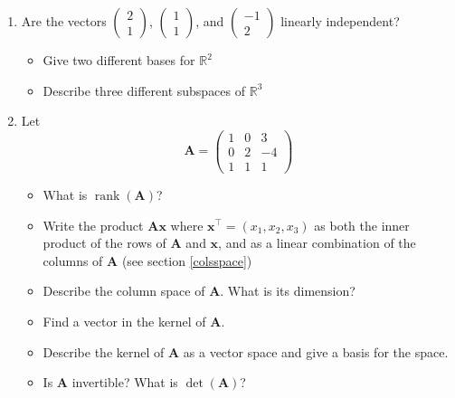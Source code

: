 \documentclass[]{book}
\providecommand{\tightlist}{%
  \setlength{\itemsep}{0pt}\setlength{\parskip}{0pt}}
\theoremstyle{definition}
\theoremstyle{definition}
\theoremstyle{definition}
\theoremstyle{remark}
\begin{document}
\begin{enumerate}
\def\labelenumi{\arabic{enumi}.}
\item
  Are the vectors \(\left( \begin{array}{c}2\\1\end{array}\right)\), \(\left( \begin{array}{c}1\\1\end{array}\right)\), and \(\left( \begin{array}{c}-1\\2\end{array}\right)\) linearly independent?

  \begin{itemize}
  \tightlist
  \item
    Give two different bases for \(\mathbb{R}^2\)
  \item
    Describe three different subspaces of \(\mathbb{R}^3\)
  \end{itemize}
\item
  Let \[\boldsymbol A= \left(\begin{array}{ccc}1&0&3\\
  0&2&-4\\
  1&1&1
  \end{array}\right)\]

  \begin{itemize}
  \tightlist
  \item
    What is \(\operatorname{rank}(\boldsymbol A)\)?
  \item
    Write the product \(\boldsymbol A\boldsymbol x\) where \(\boldsymbol x^\top=(x_1, x_2, x_3)\) as both the inner product of the rows of \(\boldsymbol A\) and \(\boldsymbol x\), and as a linear combination of the columns of \(\boldsymbol A\) (see section \ref{colsspace})
  \item
    Describe the column space of \(\boldsymbol A\). What is its dimension?
  \item
    Find a vector in the kernel of \(\boldsymbol A\).
  \item
    Describe the kernel of \(\boldsymbol A\) as a vector space and give a basis for the space.
  \item
    Is \(\boldsymbol A\) invertible? What is \(\det(\boldsymbol A)\)?
  \end{itemize}
\end{enumerate}
\end{document}
